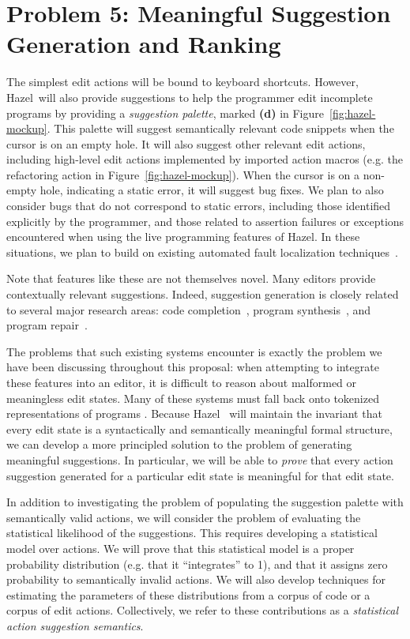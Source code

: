 \documentclass[letterpaper,USenglish]{lipics-v2016}
\newcommand{\Hazel}[0]{\textsf{Hazel}}
\newcommand{\HazelEnv}[0]{\Hazel}
\begin{document}
\section{Problem 5: Meaningful Suggestion Generation and Ranking} 
The simplest 
edit actions will be bound to keyboard shortcuts. However, \Hazel ~will also provide suggestions to help the programmer edit incomplete
programs by providing a \emph{suggestion palette}, marked \textbf{(d)} in
Figure~\ref{fig:hazel-mockup}.  This palette will suggest semantically
relevant code  
snippets when the cursor is on an empty hole. It will also suggest other relevant
edit actions, including high-level edit actions implemented by imported action
macros (e.g. the refactoring action in Figure~\ref{fig:hazel-mockup}).  When the
cursor is on a non-empty hole, indicating a static error, it will suggest
bug fixes. We plan to also consider bugs that do not correspond to static
errors, including those identified explicitly by the programmer, and those
related to assertion failures or exceptions encountered when using the live
programming features of \HazelEnv. In these situations, we plan to build on 
existing automated fault localization techniques~\cite{Jones02,
  Qi13issta,Renieris03}.

Note that features like these are not themselves novel. Many editors provide
contextually relevant suggestions. Indeed, suggestion generation is
closely related to several major research areas: code
completion~\cite{Muslu12icse-nier,icse-naturalness12}, program
synthesis~\cite{Gulwani2010}, and program
repair~\cite{legoues12tse,angelix,prophet,Ke15ase}. 

The problems that such existing systems encounter is exactly the problem we have 
been discussing throughout this proposal: when attempting to integrate these 
features into an editor, it is difficult to reason about malformed or meaningless
edit states. Many of these systems must fall back onto tokenized representations of programs \cite{icse-naturalness12}. Because \HazelEnv~ will maintain the invariant that every
edit state is a syntactically and semantically meaningful formal structure, we can develop a
more principled solution to the problem of generating meaningful suggestions. In particular,
we will be able to \emph{prove} that every action suggestion generated for a particular edit state is 
meaningful for that edit state.

In addition to investigating the problem of populating the suggestion palette
with semantically valid actions, we will consider the problem of evaluating
the statistical likelihood of the suggestions. This
requires developing a statistical model over actions.  We will prove that this statistical model is a
proper probability distribution (e.g. that it ``integrates'' to 1), and that it
assigns zero probability to semantically invalid actions. We will also develop techniques for estimating the parameters of these distributions from a corpus of code or a corpus of edit actions. Collectively, we refer 
to these contributions as a \emph{statistical action suggestion semantics}. 
\end{document}
